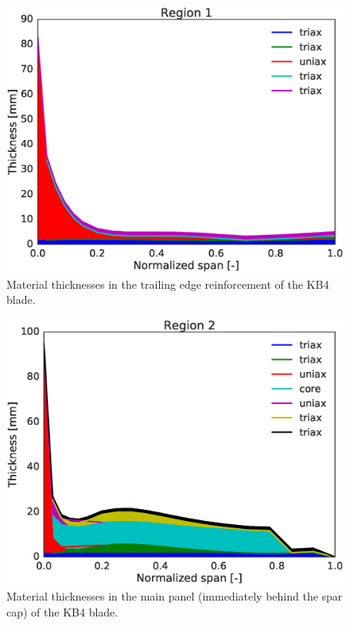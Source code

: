 \begin{figure}[!ht]
\begin{center}
	\includegraphics[width=.85\linewidth]{figures/KB4_laminate_layers_r01.eps}
\end{center}
\caption{Material thicknesses in the trailing edge reinforcement of the KB4 blade.}
\label{fig:KB4matstackr01}
\end{figure}

\begin{figure}[!ht]
\begin{center}
	\includegraphics[width=.85\linewidth]{figures/KB4_laminate_layers_r02.eps}
\end{center}
\caption{Material thicknesses in the main panel (immediately behind the spar cap) of the KB4 blade.}
\label{fig:KB4matstackr02}
\end{figure}

